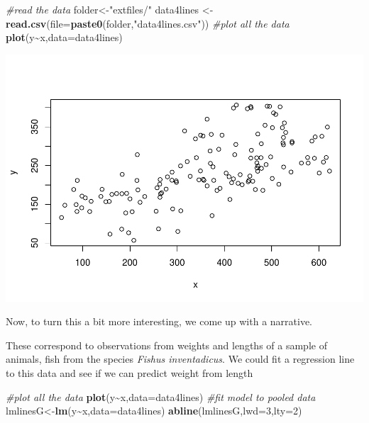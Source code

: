 \documentclass[
]{book}
\newenvironment{Shaded}{\begin{snugshade}}{\end{snugshade}}
\newcommand{\AttributeTok}[1]{\textcolor[rgb]{0.13,0.29,0.53}{#1}}
\newcommand{\CommentTok}[1]{\textcolor[rgb]{0.56,0.35,0.01}{\textit{#1}}}
\newcommand{\DecValTok}[1]{\textcolor[rgb]{0.00,0.00,0.81}{#1}}
\newcommand{\FunctionTok}[1]{\textcolor[rgb]{0.13,0.29,0.53}{\textbf{#1}}}
\newcommand{\NormalTok}[1]{#1}
\newcommand{\OtherTok}[1]{\textcolor[rgb]{0.56,0.35,0.01}{#1}}
\newcommand{\SpecialCharTok}[1]{\textcolor[rgb]{0.81,0.36,0.00}{\textbf{#1}}}
\newcommand{\StringTok}[1]{\textcolor[rgb]{0.31,0.60,0.02}{#1}}
\begin{document}
\begin{Shaded}
\begin{Highlighting}[]
\CommentTok{\#read the data}
\NormalTok{folder}\OtherTok{\textless{}{-}}\StringTok{"extfiles/"}
\NormalTok{data4lines }\OtherTok{\textless{}{-}} \FunctionTok{read.csv}\NormalTok{(}\AttributeTok{file=}\FunctionTok{paste0}\NormalTok{(folder,}\StringTok{"data4lines.csv"}\NormalTok{))}
\CommentTok{\#plot all the data}
\FunctionTok{plot}\NormalTok{(y}\SpecialCharTok{\textasciitilde{}}\NormalTok{x,}\AttributeTok{data=}\NormalTok{data4lines)}
\end{Highlighting}
\end{Shaded}

\includegraphics{ECOMODbook_files/figure-latex/a7.9-1.pdf}

Now, to turn this a bit more interesting, we come up with a narrative.

These correspond to observations from weights and lengths of a sample of animals, fish from the species \emph{Fishus inventadicus}. We could fit a regression line to this data and see if we can predict weight from length

\begin{Shaded}
\begin{Highlighting}[]
\CommentTok{\#plot all the data}
\FunctionTok{plot}\NormalTok{(y}\SpecialCharTok{\textasciitilde{}}\NormalTok{x,}\AttributeTok{data=}\NormalTok{data4lines)}
\CommentTok{\#fit model to pooled data}
\NormalTok{lmlinesG}\OtherTok{\textless{}{-}}\FunctionTok{lm}\NormalTok{(y}\SpecialCharTok{\textasciitilde{}}\NormalTok{x,}\AttributeTok{data=}\NormalTok{data4lines)}
\FunctionTok{abline}\NormalTok{(lmlinesG,}\AttributeTok{lwd=}\DecValTok{3}\NormalTok{,}\AttributeTok{lty=}\DecValTok{2}\NormalTok{)}
\end{Highlighting}
\end{Shaded}
\end{document}
